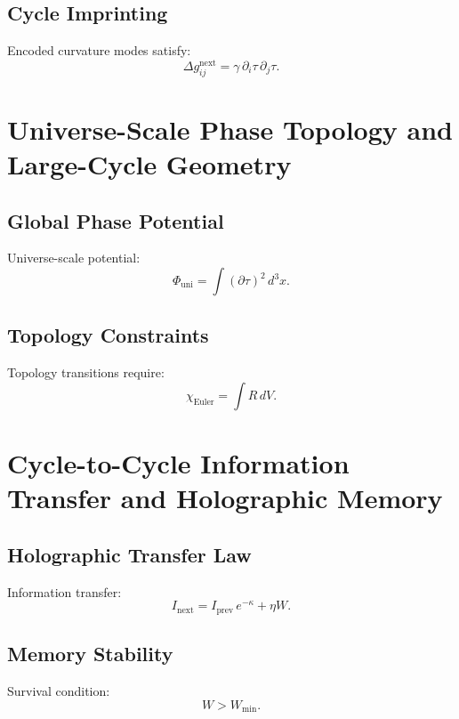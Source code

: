 \section{Cycle Imprinting}
Encoded curvature modes satisfy:
\[
\Delta g_{ij}^{\mathrm{next}} = \gamma\, \partial_i\tau\,\partial_j\tau.
\]



\chapter{Universe-Scale Phase Topology and Large-Cycle Geometry}

\section{Global Phase Potential}
Universe-scale potential:
\[
\Phi_{\mathrm{uni}} = \int (\partial\tau)^2\, d^3x.
\]

\section{Topology Constraints}
Topology transitions require:
\[
\chi_{\mathrm{Euler}} = \int R\, dV.
\]



\chapter{Cycle-to-Cycle Information Transfer and Holographic Memory}

\section{Holographic Transfer Law}
Information transfer:
\[
I_{\mathrm{next}} = I_{\mathrm{prev}}\, e^{-\kappa} + \eta W.
\]

\section{Memory Stability}
Survival condition:
\[
W > W_{\mathrm{min}}.
\]
